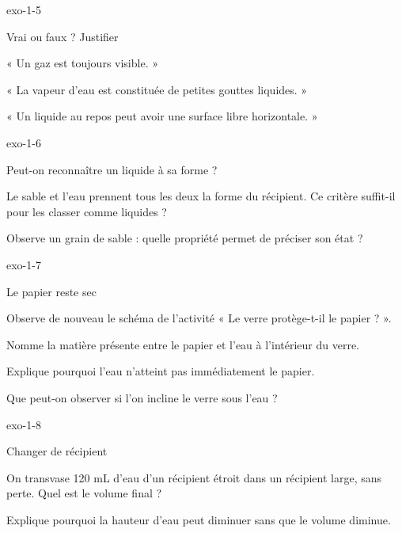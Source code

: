 \documentclass[12pt,twoside,openany]{book}
\begin{document}
\begin{blocLivre}{exo-1-5}
\begin{exercice}[1]{Vrai ou faux ? Justifier}
\begin{questions}
\item « Un gaz est toujours visible. »
\item « La vapeur d’eau est constituée de petites gouttes liquides. »
\item « Un liquide au repos peut avoir une surface libre horizontale. »
\end{questions}
\end{exercice}\end{blocLivre}
\begin{blocLivre}{exo-1-6}
\begin{exercice}[2]{Peut-on reconnaître un liquide à sa forme ?}
\begin{questions}
\item Le sable et l’eau prennent tous les deux la forme du récipient. Ce critère suffit-il pour les classer comme liquides ?
\item Observe un grain de sable : quelle propriété permet de préciser son état ?
\end{questions}
\end{exercice}\end{blocLivre}
\begin{blocLivre}{exo-1-7}
\begin{exercice}[2]{Le papier reste sec}
\begin{donnees}Observe de nouveau le schéma de l’activité « Le verre protège-t-il le papier ? ».\par
\end{donnees}
\begin{questions}
\item Nomme la matière présente entre le papier et l’eau à l’intérieur du verre.
\item Explique pourquoi l’eau n’atteint pas immédiatement le papier.
\item Que peut-on observer si l’on incline le verre sous l’eau ?
\end{questions}
\end{exercice}\end{blocLivre}
\begin{blocLivre}{exo-1-8}
\begin{exercice}[2]{Changer de récipient}
\begin{questions}
\item On transvase 120 mL d’eau d’un récipient étroit dans un récipient large, sans perte. Quel est le volume final ?
\item Explique pourquoi la hauteur d’eau peut diminuer sans que le volume diminue.
\end{questions}
\end{exercice}\end{blocLivre}
\end{document}
